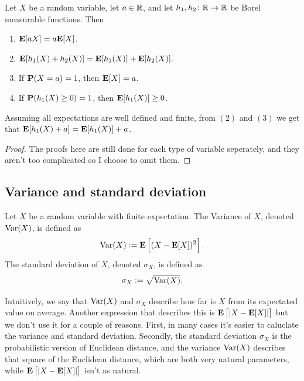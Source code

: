 \documentclass[11pt,a4paper]{article}
\begin{document}
\begin{proposition}
  Let $X$ be a random variable,
  let $a \in \mathbb{R}$,
  and let $h_1,h_2 \colon \mathbb{R} \to \mathbb{R}$ be Borel measurable functions.
  Then
  \begin{enumerate}
    \item[(1)] $\mathbf{E}[a X] = a \mathbf{E}[X]$.
    \item[(2)] $\mathbf{E}[h_1(X) + h_2(X)] = 
        \mathbf{E}[h_1(X)] + \mathbf{E}[h_2(X)].$
    \item[(3)] If $\mathbf{P}(X = a) = 1$, then $\mathbf{E}[X] = a$.
    \item[(4)] If $\mathbf{P}(h_1(X) \geq 0) = 1$, then 
        $\mathbf{E}[h_1(X)] \geq 0$.
  \end{enumerate}
  Assuming all expectations are well defined and finite, from $(2)$ and $(3)$
  we get that $\mathbf{E}[h_{1}(X)+a]=\mathbf{E}[h_{1}(X)] + a$.
\end{proposition}
\begin{proof}
  The proofs here are still done for each type of variable seperately,
  and they aren't too complicated so I choose to omit them.
\end{proof}

\subsection{Variance and standard deviation}
\begin{definition}
  Let $X$ be a random variable with finite expectation.
  The Variance of $X$, denoted $\operatorname{Var}(X)$,
  is defined as
  \[
    \operatorname{Var}(X) := \mathbf{E}\left[ (X - \mathbf{E}[X])^2 \right].
  \]
  The standard deviation of $X$, denoted $\sigma_X$, is defined as
  \[
    \sigma_X := \sqrt{\operatorname{Var}(X)}.
  \]
\end{definition}

\begin{remark}
Intuitively, we say that $\operatorname{Var}(X)$ and $\sigma_X$ describe how far is $X$
from its expectated value on average.
Another expression that describes this is
$\mathbf{E}\left[ |X - \mathbf{E}[X]| \right]$ but we don't use it
for a couple of reasons.
First, in many cases it's easier to caluclate
the variance and standard deviation.
Secondly, the standard deviation
$\sigma_X$ is the probabilistic version of Euclidean distance, and the 
variance $\operatorname{Var}(X)$ describes that square of the Euclidean distance, which
are both very natural parameters,
while $\mathbf{E}\left[ |X - \mathbf{E}[X]| \right]$ isn't as natural.
\end{remark}
\end{document}
